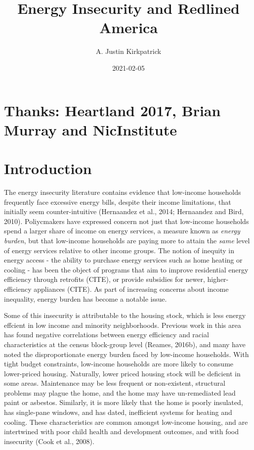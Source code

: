 \documentclass[
]{article}
\title{Energy Insecurity and Redlined America}
\author{A. Justin Kirkpatrick}
\date{2021-02-05}
\begin{document}
\maketitle

\hypertarget{thanks-heartland-2017-brian-murray-and-nicinstitute}{%
\section{Thanks: Heartland 2017, Brian Murray and
NicInstitute}\label{thanks-heartland-2017-brian-murray-and-nicinstitute}}

\hypertarget{introduction}{%
\section{Introduction}\label{introduction}}

The energy insecurity literature contains evidence that low-income
households frequently face excessive energy bills, despite their income
limitations, that initially seem counter-intuitive (Hernaandez et al.,
2014; Hernaandez and Bird, 2010). Poliycmakers have expressed concern
not just that low-income households spend a larger share of income on
energy services, a measure known as \emph{energy burden}, but that
low-income households are paying more to attain the \emph{same} level of
energy services relative to other income groups. The notion of inequity
in energy access - the ability to purchase energy services such as home
heating or cooling - has been the object of programs that aim to improve
residential energy efficiency through retrofits (CITE), or provide
subsidies for newer, higher-efficiency appliances (CITE). As part of
increasing concerns about income inequality, energy burden has become a
notable issue.

Some of this insecurity is attributable to the housing stock, which is
less energy effcient in low income and minority neighborhoods. Previous
work in this area has found negative correlations between energy
efficiency and racial characteristics at the census block-group level
(Reames, 2016b), and many have noted the disproportionate energy burden
faced by low-income households. With tight budget constraints,
low-income households are more likely to consume lower-priced housing.
Naturally, lower priced housing stock will be deficient in some areas.
Maintenance may be less frequent or non-existent, structural problems
may plague the home, and the home may have un-remediated lead paint or
asbestos. Similarly, it is more likely that the home is poorly
insulated, has single-pane windows, and has dated, inefficient systems
for heating and cooling. These characteristics are common amongst
low-income housing, and are intertwined with poor child health and
development outcomes, and with food insecurity (Cook et al., 2008).
\end{document}
